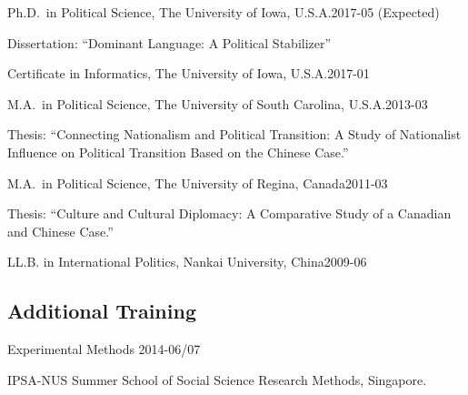 \documentclass[10.5pt,]{article}
\providecommand{\tightlist}{%
  \setlength{\itemsep}{0pt}\setlength{\parskip}{0pt}}
\renewenvironment{itemize}{
  \begin{list}{}{
    \setlength{\leftmargin}{1.5em}
  }
}{
  \end{list}
}
\begin{document}
\begin{itemize}
\tightlist
\item
  Ph.D.~in Political Science, The University of Iowa,
  U.S.A.\hfill 2017-05 (Expected)

  \begin{itemize}
  \tightlist
  \item
    \footnotesize Dissertation: ``Dominant Language: A Political
    Stabilizer''
  \end{itemize}
\item
  Certificate in Informatics, The University of Iowa,
  U.S.A.\hfill 2017-01
\item
  M.A.~in Political Science, The University of South Carolina,
  U.S.A.\hfill 2013-03

  \begin{itemize}
  \tightlist
  \item
    \footnotesize Thesis: ``Connecting Nationalism and Political
    Transition: A Study of Nationalist Influence on Political Transition
    Based on the Chinese Case.''
  \end{itemize}
\item
  M.A.~in Political Science, The University of Regina,
  Canada\hfill 2011-03

  \begin{itemize}
  \tightlist
  \item
    \footnotesize Thesis: ``Culture and Cultural Diplomacy: A
    Comparative Study of a Canadian and Chinese Case.''
  \end{itemize}
\item
  LL.B. in International Politics, Nankai University,
  China\hfill 2009-06
\end{itemize}

\subsection{Additional Training}\label{additional-training}

\begin{itemize}
\tightlist
\item
  Experimental Methods \hfill 2014-06/07

  \begin{itemize}
  \tightlist
  \item
    \footnotesize IPSA-NUS Summer School of Social Science Research
    Methods, Singapore.
  \end{itemize}
\end{itemize}
\end{document}
